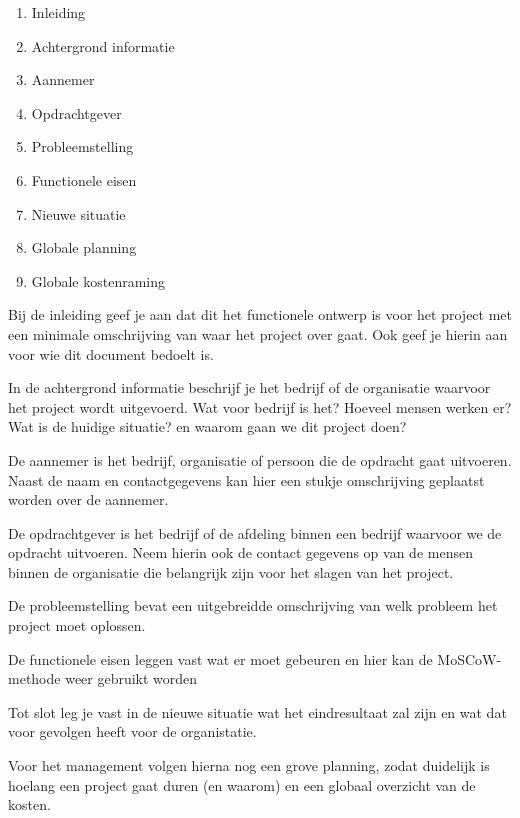 
\begin{enumerate}
\item Inleiding
\item Achtergrond informatie
\item Aannemer
\item Opdrachtgever
\item Probleemstelling
\item Functionele eisen
\item Nieuwe situatie
\item Globale planning
\item Globale kostenraming
\end{enumerate}

Bij de inleiding geef je aan dat dit het functionele ontwerp is voor het project met een minimale omschrijving van waar het project over gaat. Ook geef je hierin aan voor wie dit document bedoelt is.

In de achtergrond informatie beschrijf je het bedrijf of de organisatie waarvoor het project wordt uitgevoerd. Wat voor bedrijf is het? Hoeveel mensen werken er? Wat is de huidige situatie? en waarom gaan we dit project doen?

De aannemer is het bedrijf, organisatie of persoon die de opdracht gaat uitvoeren. Naast de naam en contactgegevens kan hier een stukje omschrijving geplaatst worden over de aannemer.

De opdrachtgever is het bedrijf of de afdeling binnen een bedrijf waarvoor we de opdracht uitvoeren. Neem hierin ook de contact gegevens op van de mensen binnen de organisatie die belangrijk zijn voor het slagen van het project.

De probleemstelling bevat een uitgebreidde omschrijving van welk probleem het project moet oplossen.

De functionele eisen leggen vast wat er moet gebeuren en hier kan de MoSCoW-methode weer gebruikt worden

Tot slot leg je vast in de nieuwe situatie wat het eindresultaat zal zijn en wat dat voor gevolgen heeft voor de organistatie.

Voor het management volgen hierna nog een grove planning, zodat duidelijk is hoelang een project gaat duren (en waarom) en een globaal overzicht van de kosten.
